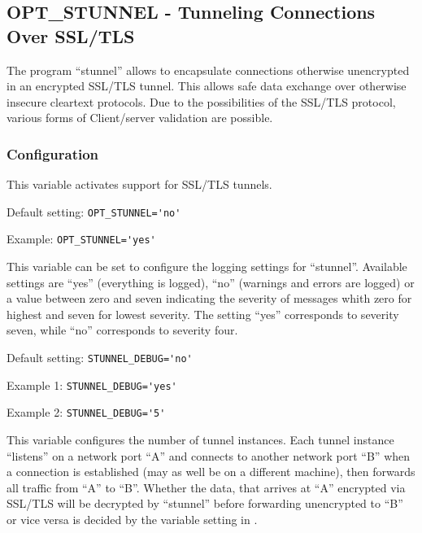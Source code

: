 \subsection{OPT\_STUNNEL - Tunneling Connections Over SSL/TLS}

The program ``stunnel'' allows to encapsulate connections otherwise unencrypted
in an encrypted SSL/TLS tunnel. This allows safe data exchange over otherwise
insecure cleartext protocols. Due to the possibilities of the SSL/TLS protocol,
various forms of Client/server validation are possible.

\subsubsection{Configuration}
\begin{description}


This variable activates support for SSL/TLS tunnels.

Default setting: \verb+OPT_STUNNEL='no'+

Example: \verb+OPT_STUNNEL='yes'+


This variable can be set to configure the logging settings for ``stunnel''.
Available settings are ``yes'' (everything is logged), ``no'' (warnings and
errors are logged) or a value between zero and seven indicating the severity of
messages whith zero for highest and seven for lowest severity. The setting ``yes''
corresponds to severity seven, while ``no'' corresponds to severity four.

Default setting: \verb+STUNNEL_DEBUG='no'+

Example 1: \verb+STUNNEL_DEBUG='yes'+

Example 2: \verb+STUNNEL_DEBUG='5'+

This variable configures the number of tunnel instances. Each tunnel instance
``listens'' on a network port ``A'' and connects to another network port ``B''
when a connection is established (may as well be on a different machine), then
forwards all traffic from ``A'' to ``B''. Whether the data, that arrives at
``A'' encrypted via SSL/TLS will be decrypted by ``stunnel'' before forwarding
unencrypted to ``B'' or vice versa is decided by the variable setting in
.


\end{description}
